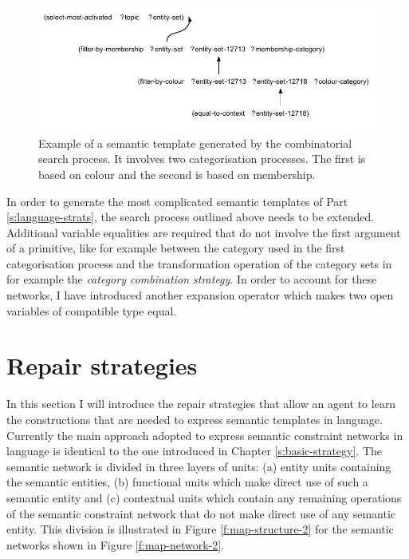 \begin{figure}[htbp]
  \begin{center}
    \includegraphics[width=\textwidth]{./composition/figures/composed-network.pdf}
    \caption[Example of a semantic template generated by the
    combinatorial search process]{Example of a semantic template
      generated by the combinatorial search process. It involves two
      categorisation processes. The first is based on colour and the
      second is based on membership.}
    \label{f:composed-network}
  \end{center}
\end{figure}

In order to generate the most complicated semantic templates of Part
\ref{s:language-strats}, the search process outlined above needs to be
extended. Additional variable equalities are required that do not
involve the first argument of a primitive, like for example between
the category used in the first categorisation process and the
transformation operation of the category sets in for example the
\emph{category combination strategy}. In order to account for these
networks, I have introduced another expansion operator which makes two
open variables of compatible type equal.

\section{Repair strategies}
\label{s:repair-strategies}

In this section I will introduce the repair strategies that allow an
agent to learn the constructions that are needed to express semantic
templates in language. Currently the main approach adopted to express
semantic constraint networks in language is identical to the one
introduced in Chapter \ref{s:basic-strategy}. The semantic network is
divided in three layers of units: (a) entity units containing the
semantic entities, (b) functional units which make direct use of such
a semantic entity and (c) contextual units which contain any remaining
operations of the semantic constraint network that do not make direct
use of any semantic entity. This division is illustrated in Figure
\ref{f:map-structure-2} for the semantic networks shown in Figure
\ref{f:map-network-2}.

